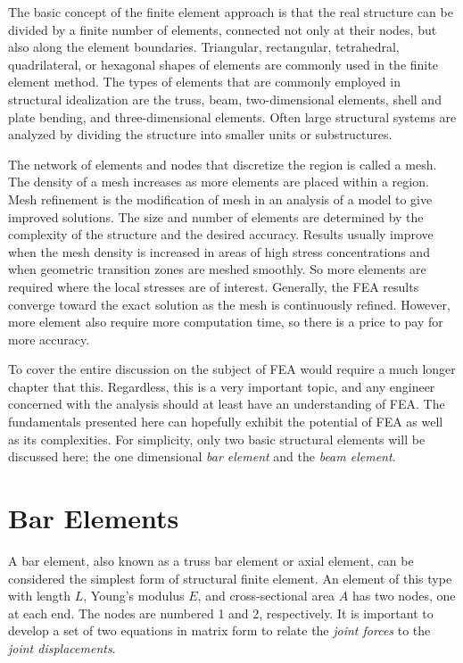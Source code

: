 \documentclass[
10pt,
a4paper,
openany,
svgnames,
]{book}
\begin{document}
The basic concept of the finite element approach is that the real structure can be divided by a finite number of elements, connected not only at their nodes, but also along the element boundaries. Triangular, rectangular, tetrahedral, quadrilateral, or hexagonal shapes of elements are commonly used in the finite element method. The types of elements that are commonly employed in structural idealization are the truss, beam, two-dimensional elements, shell and plate bending, and three-dimensional elements. Often large structural systems are analyzed by dividing the structure into smaller units or substructures.

The network of elements and nodes that discretize the region is called a mesh. The density of a mesh increases as more elements are placed within a region. Mesh refinement is the modification of mesh in an analysis of a model to give improved solutions. The size and number of elements are determined by the complexity of the structure and the desired accuracy. Results usually improve when the mesh density is increased in areas of high stress concentrations and when geometric transition zones are meshed smoothly. So more elements are required where the local stresses are of interest. Generally, the FEA results converge toward the exact solution as the mesh is continuously refined. However, more element also require more computation time, so there is a price to pay for more accuracy.

To cover the entire discussion on the subject of FEA would require a much longer chapter that this. Regardless, this is a very important topic, and any engineer concerned with the analysis should at least have an understanding of FEA. The fundamentals presented here can hopefully exhibit the potential of FEA as well as its complexities. For simplicity, only two basic structural elements will be discussed here; the one dimensional \emph{bar element} and the \emph{beam element}.

\section{Bar Elements}

A bar element, also known as a truss bar element or axial element, can be considered the simplest form of structural finite element. An element of this type with length $L$, Young’s modulus $E$, and cross-sectional area $A$ has two nodes, one at each end. The nodes are numbered 1 and 2, respectively. It is important to develop a set of two equations in matrix form to relate the \emph{joint forces} to the \emph{joint displacements}.
\end{document}
